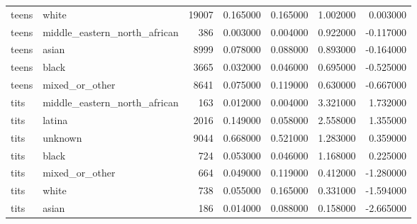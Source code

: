 \begin{tabular}{llrrrrr}
teens & white & 19007 & 0.165000 & 0.165000 & 1.002000 & 0.003000 \\
teens & middle_eastern_north_african & 386 & 0.003000 & 0.004000 & 0.922000 & -0.117000 \\
teens & asian & 8999 & 0.078000 & 0.088000 & 0.893000 & -0.164000 \\
teens & black & 3665 & 0.032000 & 0.046000 & 0.695000 & -0.525000 \\
teens & mixed_or_other & 8641 & 0.075000 & 0.119000 & 0.630000 & -0.667000 \\
tits & middle_eastern_north_african & 163 & 0.012000 & 0.004000 & 3.321000 & 1.732000 \\
tits & latina & 2016 & 0.149000 & 0.058000 & 2.558000 & 1.355000 \\
tits & unknown & 9044 & 0.668000 & 0.521000 & 1.283000 & 0.359000 \\
tits & black & 724 & 0.053000 & 0.046000 & 1.168000 & 0.225000 \\
tits & mixed_or_other & 664 & 0.049000 & 0.119000 & 0.412000 & -1.280000 \\
tits & white & 738 & 0.055000 & 0.165000 & 0.331000 & -1.594000 \\
tits & asian & 186 & 0.014000 & 0.088000 & 0.158000 & -2.665000 \\
\bottomrule
\end{tabular}
